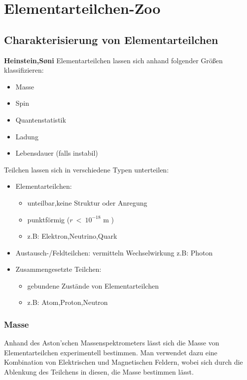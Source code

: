 \documentclass[Ex4_Zusammenfassung.tex]{subfiles}
\begin{document}
\chapter{Elementarteilchen-Zoo}	
\section{Charakterisierung von Elementarteilchen}
\textbf{Heinstein,S\o{}ni} \newline
Elementarteilchen lassen sich anhand folgender Größen klassifizieren:
\begin{itemize}
\item Masse
\item Spin
\item Quantenstatistik
\item Ladung
\item Lebensdauer (falls instabil)
\end{itemize}
Teilchen lassen sich  in verschiedene Typen unterteilen: 
\begin{itemize}
\item Elementarteilchen: \begin{itemize}
						\item unteilbar,keine Struktur oder Anregung
						\item punktförmig ($ r \ < \ 10^{-18} $ m )
						\item z.B: Elektron,Neutrino,Quark
						\end{itemize}
\item Austausch-/Feldteilchen: vermitteln Wechselwirkung z.B: Photon
\item Zusammengesetzte Teilchen: \begin{itemize}
						\item gebundene Zustände von Elementarteilchen
						\item z.B: Atom,Proton,Neutron
								\end{itemize}
\end{itemize} \newpage
\subsection{Masse}
Anhand des Aston'schen Massenspektrometers lässt sich die Masse von Elementarteilchen experimentell bestimmen. 
Man verwendet dazu eine Kombination von Elektrischen und Magnetischen Feldern, wobei sich durch die Ablenkung des Teilchens in diesen, die Masse bestimmen lässt. 
\end{document}
